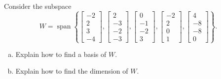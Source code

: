 
\begin{exerciseStatement}


Consider the subspace \[W=\operatorname{span}  \left\{ \left[\begin{array}{c}
-2 \\
2 \\
3 \\
-4
\end{array}\right] , \left[\begin{array}{c}
2 \\
-3 \\
-2 \\
-3
\end{array}\right] , \left[\begin{array}{c}
0 \\
-1 \\
-2 \\
3
\end{array}\right] , \left[\begin{array}{c}
-2 \\
2 \\
0 \\
1
\end{array}\right] , \left[\begin{array}{c}
4 \\
-8 \\
-8 \\
0
\end{array}\right] \right\} .\]


\begin{enumerate}[(a)]
\item  Explain how to find a basis of \(W\).
\item  Explain how to find the dimension of \(W\).
\end{enumerate}
    
\end{exerciseStatement}
    
